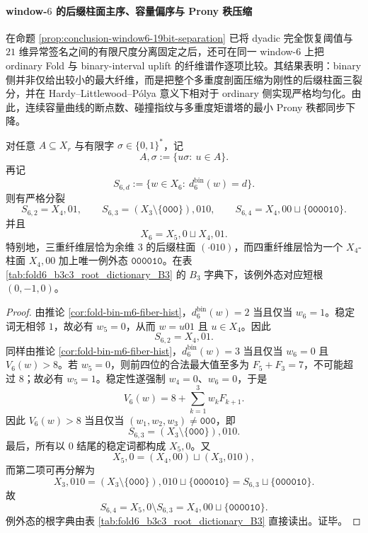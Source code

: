 \paragraph{window-\texorpdfstring{$6$}{6} 的后缀柱面主序、容量偏序与 Prony 秩压缩}
在命题 \ref{prop:conclusion-window6-19bit-separation} 已将 dyadic 完全恢复阈值与 \(21\) 维异常签名之间的有限尺度分离固定之后，还可在同一 window-\(6\) 上把 ordinary Fold 与 binary-interval uplift 的纤维谱作逐项比较。其结果表明：binary 侧并非仅给出较小的最大纤维，而是把整个多重度剖面压缩为刚性的后缀柱面三裂分，并在 Hardy--Littlewood--Pólya 意义下相对于 ordinary 侧实现严格均匀化。由此，连续容量曲线的断点数、碰撞指纹与多重度矩谱塔的最小 Prony 秩都同步下降。

\begin{theorem}\label{thm:conclusion-window6-binary-suffix-cylinder-trichotomy}
对任意 \(A\subseteq X_r\) 与有限字 \(\sigma\in\{0,1\}^\ast\)，记
\[
A,\sigma:=\{u\sigma:\ u\in A\}.
\]
再记
\[
S_{6,d}:=\{w\in X_6:\ d_6^{\mathrm{bin}}(w)=d\}.
\]
则有严格分裂
\[
S_{6,2}=X_4,01,
\qquad
S_{6,3}=(X_3\setminus\{\texttt{000}\}),010,
\qquad
S_{6,4}=X_4,00\sqcup\{\texttt{000010}\}.
\]
并且
\[
X_6=X_5,0\sqcup X_4,01.
\]
特别地，三重纤维层恰为余维 \(3\) 的后缀柱面 \((\cdot010)\)，而四重纤维层恰为一个 \(X_4\)-柱面 \(X_4,00\) 加上唯一例外态 \(\texttt{000010}\)。在表 \ref{tab:fold6_b3c3_root_dictionary_B3} 的 \(B_3\) 字典下，该例外态对应短根 \((0,-1,0)\)。
\end{theorem}
\begin{proof}
由推论 \ref{cor:fold-bin-m6-fiber-hist}，\(d_6^{\mathrm{bin}}(w)=2\) 当且仅当 \(w_6=1\)。稳定词无相邻 \(1\)，故必有 \(w_5=0\)，从而 \(w=u01\) 且 \(u\in X_4\)。因此
\[
S_{6,2}=X_4,01.
\]
同样由推论 \ref{cor:fold-bin-m6-fiber-hist}，\(d_6^{\mathrm{bin}}(w)=3\) 当且仅当 \(w_6=0\) 且 \(V_6(w)>8\)。若 \(w_5=0\)，则前四位的合法最大值至多为 \(F_5+F_3=7\)，不可能超过 \(8\)；故必有 \(w_5=1\)。稳定性遂强制 \(w_4=0\)、\(w_6=0\)，于是
\[
V_6(w)=8+\sum_{k=1}^{3} w_kF_{k+1}.
\]
因此 \(V_6(w)>8\) 当且仅当 \((w_1,w_2,w_3)\neq \texttt{000}\)，即
\[
S_{6,3}=(X_3\setminus\{\texttt{000}\}),010.
\]
最后，所有以 \(0\) 结尾的稳定词都构成 \(X_5,0\)。又
\[
X_5,0=(X_4,00)\sqcup (X_3,010),
\]
而第二项可再分解为
\[
X_3,010=(X_3\setminus\{\texttt{000}\}),010\sqcup\{\texttt{000010}\}
=S_{6,3}\sqcup\{\texttt{000010}\}.
\]
故
\[
S_{6,4}=X_5,0\setminus S_{6,3}=X_4,00\sqcup\{\texttt{000010}\}.
\]
例外态的根字典由表 \ref{tab:fold6_b3c3_root_dictionary_B3} 直接读出。证毕。
\end{proof}

